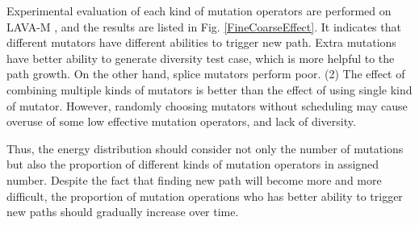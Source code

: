 Experimental evaluation of each kind of mutation operators are performed on LAVA-M \cite{lava}, and the results are listed in Fig. \ref{FineCoarseEffect}. It indicates that different mutators have different abilities to trigger new path. Extra mutations have better ability to generate diversity test case, which is more helpful to the path growth. On the other hand, splice mutators perform poor. (2) The effect of combining multiple kinds of mutators is better than the effect of using single kind of mutator.%
However,  randomly choosing mutators without scheduling may cause overuse of some low effective mutation operators, and lack of diversity.


Thus, the energy distribution should consider not only the number of mutations but also the proportion of different kinds of mutation operators in assigned number. Despite the fact that finding new path will become more and more difficult, the proportion of mutation operations who has better ability to trigger new paths should gradually increase over time.


 


